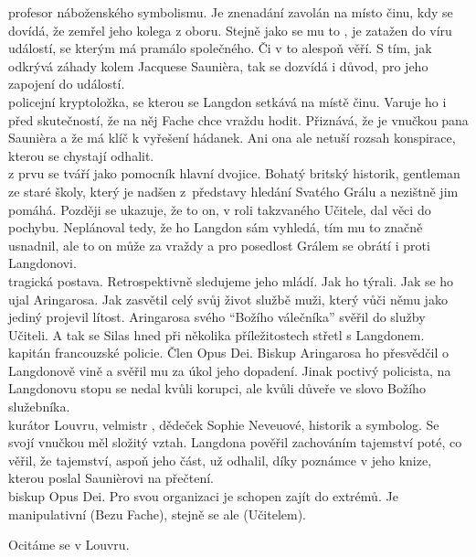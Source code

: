 \documentclass{extarticle} %
\begin{document}
\noindent 
{} profesor náboženského symbolismu.
Je znenadání zavolán na místo činu, kdy se dovídá, že zemřel jeho kolega z oboru.
Stejně jako se mu to , je zatažen do víru událostí,
se kterým má pramálo společného.
Či v to alespoň věří.
S tím, jak odkrývá záhady kolem Jacquese Saunièra, tak se dozvídá i důvod,
pro jeho zapojení do událostí.\\
 policejní kryptoložka,
se kterou se Langdon setkává na místě činu.
Varuje ho i před skutečností, že na něj Fache chce vraždu hodit.
Přiznává, že je vnučkou pana Saunièra a že má klíč k vyřešení hádanek.
Ani ona ale netuší rozsah konspirace, kterou se chystají odhalit.\\
 z prvu se tváří jako pomocník hlavní dvojice.
Bohatý britský historik, gentleman ze staré školy,
který je nadšen z~představy hledání Svatého Grálu a nezištně jim pomáhá.
Později se ukazuje, že to on, v roli takzvaného Učitele, dal věci do pochybu.
Neplánoval tedy, že ho Langdon sám vyhledá, tím mu to značně usnadnil,
ale to on může za vraždy a pro posedlost Grálem se obrátí i proti Langdonovi.\\
 tragická postava.
Retrospektivně sledujeme jeho mládí.
Jak ho týrali.
Jak se ho ujal Aringarosa.
Jak zasvětil celý svůj život službě muži,
který vůči němu jako jediný projevil lítost.
Aringarosa svého \enquote{Božího válečníka} svěřil do služby Učiteli.
A tak se Silas hned při několika příležitostech střetl s Langdonem.\\
 kapitán francouzské policie.
Člen Opus Dei.
Biskup Aringarosa ho přesvědčil o Langdonově vině
a svěřil mu za úkol jeho dopadení.
Jinak poctivý policista, na Langdonovu stopu se nedal kvůli korupci,
ale kvůli důveře ve slovo Božího služebníka.\\
 kurátor Louvru,
velmistr ,
dědeček Sophie Neveuové,
historik a symbolog.
Se svojí vnučkou měl složitý vztah.
Langdona pověřil zachováním tajemství poté, co věřil,
že tajemství, aspoň jeho část, už odhalil, díky poznámce v jeho knize,
kterou poslal Saunièrovi na přečtení.\\
 biskup Opus Dei.
Pro svou organizaci je schopen zajít do extrémů.
Je manipulativní (Bezu Fache),
stejně se ale  (Učitelem).

\noindent Ocitáme se v Louvru.
\end{document}
